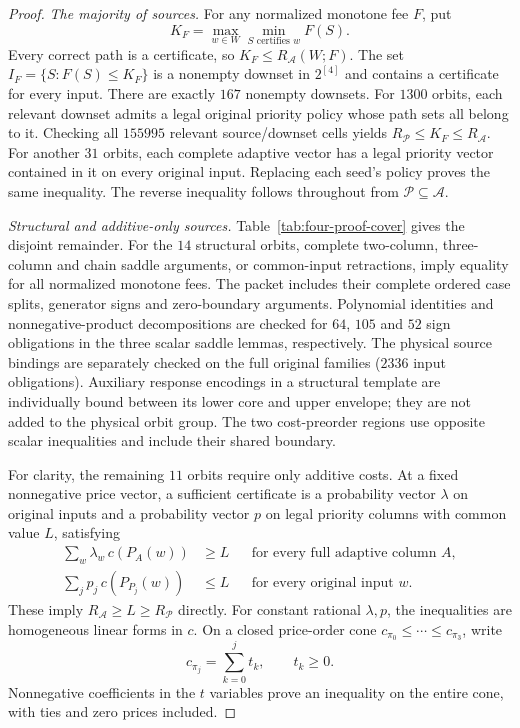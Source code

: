 \begin{proof}
\emph{The majority of sources.}
For any normalized monotone fee $F$, put
\[
 K_F=\max_{w\in W}\min_{S\text{ certifies }w} F(S).
\]
Every correct path is a certificate, so $K_F\leq R_{\mathcal A}(W;F)$.
The set $I_F=\{S:F(S)\leq K_F\}$ is a nonempty downset in $2^{[4]}$
and contains a certificate for every input. There are exactly $167$
nonempty downsets. For $1300$ orbits, each relevant downset admits a
legal original priority policy whose path sets all belong to it.
Checking all $155995$ relevant source/downset cells yields
$R_{\mathcal P}\leq K_F\leq R_{\mathcal A}$. For another $31$ orbits,
each complete adaptive vector has a legal priority vector contained
in it on every original input. Replacing each seed's policy proves
the same inequality. The reverse inequality follows throughout from
$\mathcal P\subseteq\mathcal A$.

\emph{Structural and additive-only sources.}
Table~\ref{tab:four-proof-cover} gives the disjoint remainder. For the
$14$ structural orbits, complete two-column, three-column and chain
saddle arguments, or common-input retractions, imply equality for all
normalized monotone fees. The packet includes their complete ordered
case splits, generator signs and zero-boundary arguments. Polynomial
identities and nonnegative-product decompositions are checked for
$64$, $105$ and $52$ sign obligations in the three scalar saddle
lemmas, respectively. The physical source bindings are separately
checked on the full original families ($2336$ input obligations).
Auxiliary response encodings in a structural template are individually
bound between its lower core and upper envelope; they are not added
to the physical orbit group. The two cost-preorder regions use opposite
scalar inequalities and include their shared boundary.

For clarity, the remaining $11$ orbits require only additive costs.
At a fixed nonnegative price vector, a sufficient certificate is a
probability vector $\lambda$ on original inputs and a probability
vector $p$ on legal priority columns with common value $L$, satisfying
\begin{align}
 \sum_w\lambda_w\,c(P_A(w))&\geq L
       &&\text{for every full adaptive column }A,\label{eq:four-dual}\\
 \sum_jp_j\,c(P_{P_j}(w))&\leq L
       &&\text{for every original input }w.\label{eq:four-upper}
\end{align}
These imply $R_{\mathcal A}\geq L\geq R_{\mathcal P}$ directly.
For constant rational $\lambda,p$, the inequalities are homogeneous
linear forms in $c$. On a closed price-order cone
$c_{\pi_0}\leq\cdots\leq c_{\pi_3}$, write
\[
 c_{\pi_j}=\sum_{k=0}^{j}t_k,\qquad t_k\geq0.
\]
Nonnegative coefficients in the $t$ variables prove an inequality
on the entire cone, with ties and zero prices included.


\end{proof}
